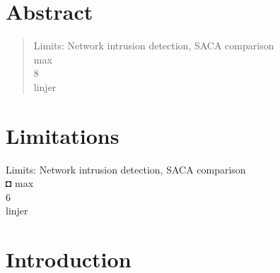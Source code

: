\documentclass[12pt]{article} %
\begin{document}






\newpage %
\tableofcontents
\newpage

\renewcommand{\abstractname}{Special thanks to...} %
\section{Abstract}
\begin{abstract}
\noindent
Limits: Network intrusion detection, SACA comparison \\
max \\ 
8 \\
linjer 

\end{abstract}

\section{Limitations}
Limits: Network intrusion detection, SACA comparison \\◘
max \\
6 \\ 
linjer \\






\section{Introduction}
\end{document}
